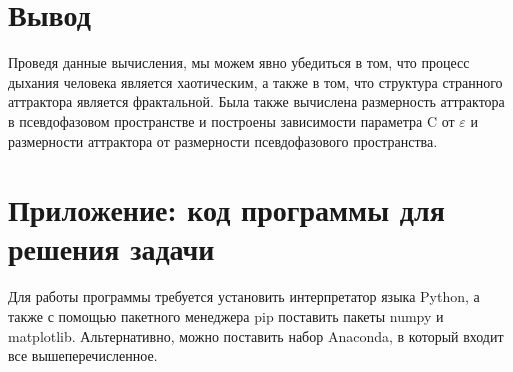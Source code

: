 \documentclass[12pt, oneside, a4paper]{article}
\begin{document}
\section{Вывод}
Проведя данные вычисления, мы можем явно убедиться в том, что процесс дыхания человека является хаотическим, а также в том, что структура странного аттрактора является фрактальной. Была также вычислена размерность аттрактора в псевдофазовом пространстве и построены зависимости параметра C от $\varepsilon$ и размерности аттрактора от размерности псевдофазового пространства.
\newpage
\section*{Приложение: код программы для решения задачи}
Для работы программы требуется установить интерпретатор языка Python, а также
с помощью пакетного менеджера pip поставить пакеты numpy и matplotlib. 
Альтернативно, можно поставить набор Anaconda, в который входит все вышеперечисленное.
\end{document}
